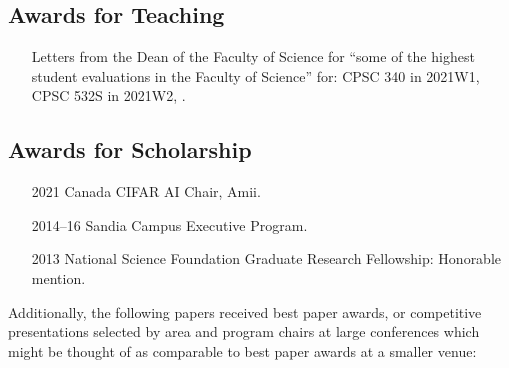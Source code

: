 \documentclass[10pt]{article}
\begin{document}

\subsection{Awards for Teaching} %

\begin{itemize}[leftmargin=5em]
    \item[] Letters from the Dean of the Faculty of Science for ``some of the highest student evaluations in the Faculty of Science'' for: CPSC 340 in 2021W1, CPSC 532S in 2021W2, .
\end{itemize}

\subsection{Awards for Scholarship} %

\begin{itemize}[leftmargin=5em]
  \item[2021] {Canada CIFAR AI Chair, Amii. } %

  \item[2014--16] Sandia Campus Executive Program. 
  \item[2013] National Science Foundation Graduate Research Fellowship: Honorable mention.
\end{itemize}

Additionally, the following papers received best paper awards,
or competitive presentations selected by area and program chairs at large conferences
which might be thought of as comparable to best paper awards at a smaller venue:
\begin{itemize}[leftmargin=5em]
  
\end{itemize}
\end{document}
